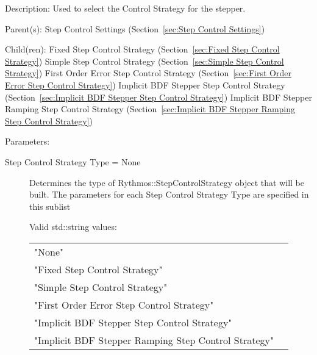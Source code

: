 \begin{list}{}
  {\setlength{\leftmargin}{1.0in}
   \setlength{\labelwidth}{0.75in}
   \setlength{\labelsep}{0.125in}}
  \item[Description:]
    Used to select the Control Strategy for the stepper.
  \item[Parent(s):]
    Step Control Settings (Section~\ref{sec:Step Control Settings})
  \item[Child(ren):]
    Fixed Step Control Strategy (Section~\ref{sec:Fixed Step Control Strategy})
      \newline 
    Simple Step Control Strategy (Section~\ref{sec:Simple Step Control Strategy})
      \newline 
    First Order Error Step Control Strategy (Section~\ref{sec:First Order Error Step Control Strategy})
      \newline 
    Implicit BDF Stepper Step Control Strategy (Section~\ref{sec:Implicit BDF Stepper Step Control Strategy})
      \newline 
    Implicit BDF Stepper Ramping Step Control Strategy (Section~\ref{sec:Implicit BDF Stepper Ramping Step Control Strategy})
  \item[Parameters:]
    \begin{description}
      \item[Step Control Strategy Type = None] 
Determines the type of Rythmos::StepControlStrategy object that will be built.
The parameters for each Step Control Strategy Type are specified in this sublist

  Valid std::string values:

      \begin{tabular}{lp{}}
      "None" & \\ 
      "Fixed Step Control Strategy" & \\ 
      "Simple Step Control Strategy" & \\ 
      "First Order Error Step Control Strategy" & \\ 
      "Implicit BDF Stepper Step Control Strategy" & \\ 
      "Implicit BDF Stepper Ramping Step Control Strategy" & \\ 
      \end{tabular}
\end{description}

\end{list}

